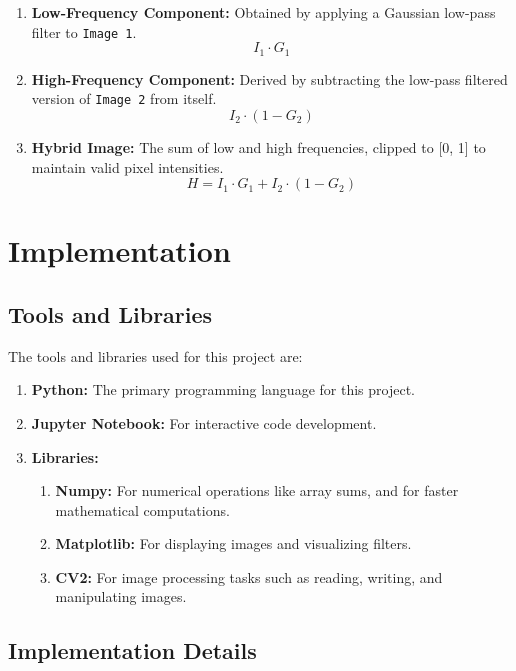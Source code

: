 \documentclass[12pt]{report}
\begin{document}
\vspace{-1.25em}
\begin{enumerate}
	\setlength\itemsep{-1.05em}

	\item{\textbf{Low-Frequency Component: }}Obtained by applying a Gaussian low-pass filter to \texttt{Image 1}.
	$$ I_1 \cdot G_1 $$
	\item{\textbf{High-Frequency Component: }}Derived by subtracting the low-pass filtered version of \texttt{Image 2} from itself.
	$$ I_2 \cdot (1 - G_2) $$
	\item{\textbf{Hybrid Image: }}The sum of low and high frequencies, clipped to [0, 1] to maintain valid pixel intensities.
	$$ H = I_1 \cdot G_1 + I_2 \cdot (1 - G_2) $$

\end{enumerate}

\chapter{Implementation}
\section{Tools and Libraries}
The tools and libraries used for this project are:
\vspace{-1.25em}
\begin{enumerate}
    \setlength\itemsep{-1.05em}
    \item{\textbf{Python:}} The primary programming language for this project.
    \item{\textbf{Jupyter Notebook:}} For interactive code development.
    \item{\textbf{Libraries:}}
        \vspace{-1.5em}
        \begin{enumerate}
            \setlength\itemsep{-1.5em}
            \item{\textbf{Numpy:}} For numerical operations like array sums, and for faster mathematical computations.
						\item{\textbf{Matplotlib:}} For displaying images and visualizing filters.
						\item{\textbf{CV2:}} For image processing tasks such as reading, writing, and manipulating images.
				\end{enumerate}
\end{enumerate}

\section{Implementation Details}
\end{document}
